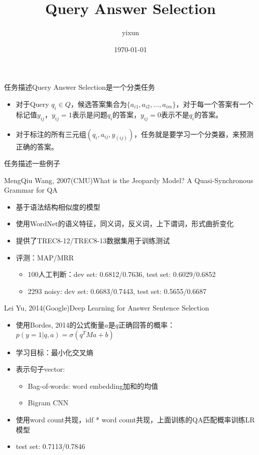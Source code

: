 \documentclass{beamer}
\title{Query Answer Selection}
\author{yixun}
\date{\today}
\begin{document}
\begin{frame}
\titlepage
\end{frame}
\begin{frame}{任务描述}{Query Answer Selection是一个分类任务}
\begin{itemize}
\item 对于Query $q_i \in Q$，候选答案集合为$\{a_{i1}, a_{i2}, \dots, a_{im}\}$，对于每一个答案有一个标记值$y_{ij}$，$y_{ij} = 1$表示是问题$q_i$的答案，$y_{ij} = 0$表示不是$q_i$的答案。
\item 对于标注的所有三元组$(q_i, a_{ij}, y_(ij))$，任务就是要学习一个分类器，来预测正确的答案。
\end{itemize}
\end{frame}
\begin{frame}{任务描述}{一些例子}

\end{frame}
\begin{frame}{MengQiu Wang, 2007(CMU)}{What is the Jeopardy Model? A Quasi-Synchronous Grammar for QA}
\begin{itemize}
\item 基于语法结构相似度的模型
\item 使用WordNet的语义特征，同义词，反义词，上下谓词，形式曲折变化
\item 提供了TREC8-12/TREC8-13数据集用于训练测试
\item 评测：MAP/MRR
  \begin{itemize}
  \item 100人工判断：dev set: 0.6812/0.7636, test set: 0.6029/0.6852
  \item 2293 noisy: dev set: 0.6683/0.7443, test set: 0.5655/0.6687
  \end{itemize}
\end{itemize}
\end{frame}
\begin{frame}{Lei Yu, 2014(Google)}{Deep Learning for Answer Sentence Selection}
\begin{itemize}
\item 使用Bordes, 2014的公式衡量$a$是$q$正确回答的概率：
  $p(y=1|q,a)=\sigma(q^TMa+b)$
\item 学习目标：最小化交叉熵
\item 表示句子vector:
  \begin{itemize}
  \item Bag-of-words: word embedding加和的均值
  \item Bigram CNN
  \end{itemize}
\item 使用word count共现，idf * word count共现，上面训练的QA匹配概率训练LR模型
\item test set: 0.7113/0.7846
\end{itemize}
\end{frame}
\end{document}
